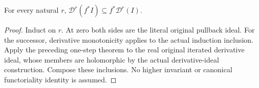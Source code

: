 \begin{theorem}\label{hir:crossdim-iterated-inclusion}
For every natural $r$, $\mathcal D^r(f^*I)\subseteq f^*\mathcal D^r(I)$.
\leanok
{}
\end{theorem}
\begin{proof}
Induct on $r$. At zero both sides are the literal original pullback ideal.
For the successor, derivative monotonicity applies to the actual induction
inclusion. Apply the preceding one-step theorem to the real original
iterated derivative ideal, whose members are holomorphic by the actual
derivative-ideal construction. Compose these inclusions. No higher
invariant or canonical functoriality identity is assumed.
\end{proof}
